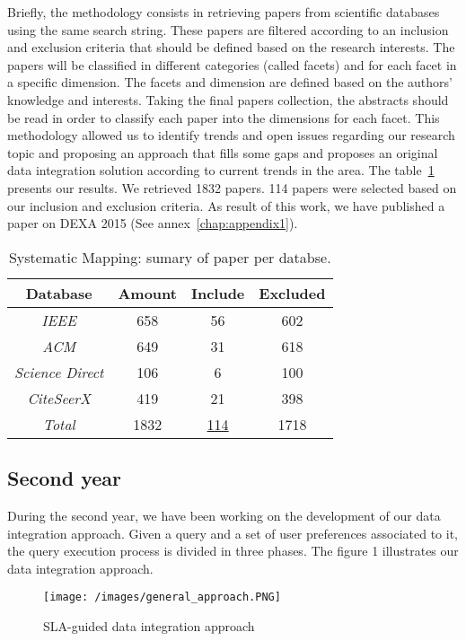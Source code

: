 Briefly, the methodology consists in retrieving papers from scientific databases using the same search string. 
These papers are filtered according to an inclusion and exclusion criteria that should be defined based on the research interests. 
The papers will be classified in different categories (called facets) and for each facet in a specific dimension. 
The facets and dimension are defined based on the authors' knowledge and interests. 
Taking the final papers collection, the abstracts should be read in order to classify each paper into the dimensions for each facet. 
This methodology allowed us to identify trends and open issues regarding our research topic and proposing an approach that fills some gaps and proposes an original data integration solution according to current trends in the area.
The table~\ref{table:sysmap} presents our results. We retrieved 1832 papers. 114 papers were selected based on our inclusion and exclusion criteria.
As result of this work, we have published a paper on DEXA 2015 (See annex~\ref{chap:appendix1}).

\begin{table}
\center
\begin{tabular}{|c|c|c|c|}
\hline 
\textbf{Database} & \textbf{Amount} & \textbf{Include} & \textbf{Excluded} \\ 
\hline 
\textit{IEEE} & 658 & 56 & 602 \\ 
\hline 
\textit{ACM} & 649 & 31 & 618 \\ 
\hline 
\textit{Science Direct} & 106 & 6 & 100 \\ 
\hline 
\textit{CiteSeerX} & 419 & 21 & 398 \\ 
\hline 
\textit{Total} & 1832 & \underline{114} & 1718 \\ 
\hline 
\end{tabular} 
\caption{Systematic Mapping: sumary of paper per databse.}\label{table:sysmap}
\end{table} 

\subsection{Second year}

During the second year, we have been working on the development of our data integration approach. Given a query and a set of user preferences associated to it, the query execution process is divided in three phases. The figure 1 illustrates our data integration approach.

\begin{figure}[h!]
\center
\texttt{[image: /images/general\_approach.PNG]} 
\caption{SLA-guided data integration approach}
\end{figure}

